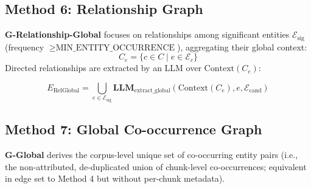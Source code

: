 \documentclass{article}
\theoremstyle{plain}
\theoremstyle{definition}
\theoremstyle{remark}
\begin{document}
\subsection{Method 6: Relationship Graph}
\textbf{G-Relationship-Global} focuses on relationships among significant entities $\mathcal{E}_{\text{sig}}$ (frequency $\ge \text{MIN\_ENTITY\_OCCURRENCE}$), aggregating their global context:
\begin{equation}
C_e = \{c \in C \mid e \in \mathcal{E}_c \}
\end{equation}
Directed relationships are extracted by an LLM over $\text{Context}(C_e)$:
\begin{small}
\begin{equation}
E_{\text{RelGlobal}} = \bigcup_{e \in \mathcal{E}_{\text{sig}}} \mathbf{LLM}_{\text{extract\_global}}(\text{Context}(C_e), e, \mathcal{E}_{\text{cand}})
\end{equation}
\end{small}

\subsection{Method 7: Global Co-occurrence Graph}
\textbf{G-Global} derives the corpus-level unique set of co-occurring entity pairs (i.e., the non-attributed, de-duplicated union of chunk-level co-occurrences; equivalent in edge set to Method 4 but without per-chunk metadata).
\end{document}
